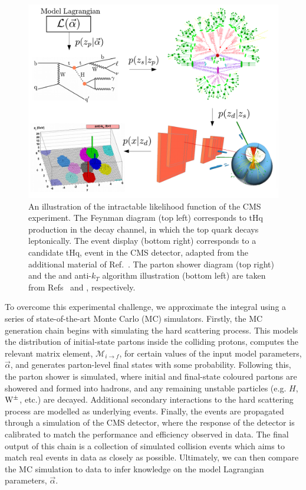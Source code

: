 \begin{figure}[htb!]
  \centering
  \includegraphics[width=1\textwidth]{Figures/cms/mc_integral.pdf}
  \caption[The intractable likelihood function of the CMS experiment]
  {
    An illustration of the intractable likelihood function of the CMS experiment. The Feynman diagram (top left) corresponds to tHq production in the \Hgg decay channel, in which the top quark decays leptonically. The event display (bottom right) corresponds to a candidate tHq, \Hgg event in the CMS detector, adapted from the additional material of Ref.~\cite{CMS-PAS-HIG-19-015}. The parton shower diagram (top right) and the and anti-$k_T$ algorithm illustration (bottom left) are taken from Refs~\cite{Hoche:2014rga} and \cite{Cacciari:2008gp}, respectively.
  }
  \label{fig:mc_illustration}
\end{figure}

To overcome this experimental challenge, we approximate the integral using a series of state-of-the-art Monte Carlo (MC) simulators. Firstly, the MC generation chain begins with simulating the hard scattering process. This models the distribution of initial-state partons inside the colliding protons, computes the relevant matrix element, $\mathcal{M}_{i\rightarrow f}$, for certain values of the input model parameters, $\vec{\alpha}$, and generates parton-level final states with some probability. Following this, the parton shower is simulated, where initial and final-state coloured partons are showered and formed into hadrons, and any remaining unstable particles (e.g. $H$, ${\rm{W}}^{\pm}$, etc.) are decayed. Additional secondary interactions to the hard scattering process are modelled as underlying events. Finally, the events are propagated through a simulation of the CMS detector, where the response of the detector is calibrated to match the performance and efficiency observed in data. The final output of this chain is a collection of simulated collision events which aims to match real events in data as closely as possible. Ultimately, we can then compare the MC simulation to data to infer knowledge on the model Lagrangian parameters, $\vec{\alpha}$.

